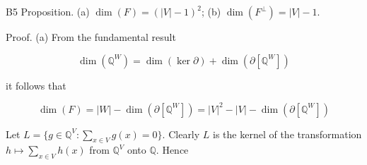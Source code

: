 B5 Proposition. (a) $\dim(F) = (|V| - 1)^2$; (b) $\dim(F^\perp) = |V| - 1$.

Proof. (a) From the fundamental result

$$\dim(\mathbb{Q}^W) = \dim(\ker \partial) + \dim(\partial[\mathbb{Q}^W])$$

it follows that

$$\dim(F) = |W| - \dim(\partial[\mathbb{Q}^W]) = |V|^2 - |V| - \dim(\partial[\mathbb{Q}^W])$$

Let $L = \{g \in \mathbb{Q}^V : \sum_{x \in V} g(x) = 0\}$. Clearly $L$ is the kernel of the transformation $h \mapsto \sum_{x \in V} h(x)$ from $\mathbb{Q}^V$ onto $\mathbb{Q}$. Hence
